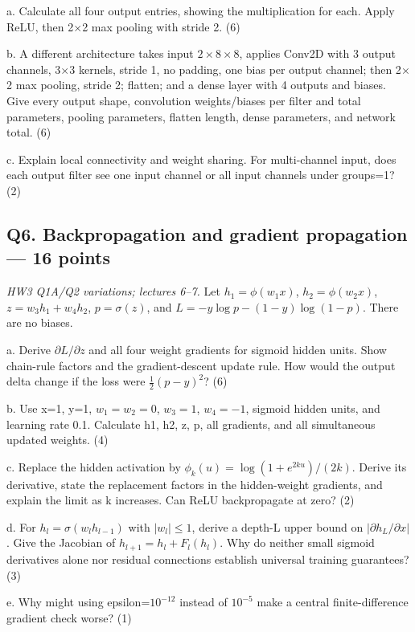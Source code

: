 \documentclass[11pt]{article}
\begin{document}
a. Calculate all four output entries, showing the multiplication for each. Apply ReLU, then 2\ensuremath{\times}2 max pooling with stride 2. (6)

b. A different architecture takes input $2\times 8\times 8$, applies Conv2D with 3 output channels, 3\ensuremath{\times}3 kernels, stride 1, no padding, one bias per output channel; then 2\ensuremath{\times}2 max pooling, stride 2; flatten; and a dense layer with 4 outputs and biases. Give every output shape, convolution weights/\allowbreak{}biases per filter and total parameters, pooling parameters, flatten length, dense parameters, and network total. (6)

c. Explain local connectivity and weight sharing. For multi-channel input, does each output filter see one input channel or all input channels under groups=1? (2)

\subsection*{Q6. Backpropagation and gradient propagation — 16 points}

\emph{HW3 Q1A/\allowbreak{}Q2 variations; lectures 6–7.} Let $h_1=\phi(w_1x)$, $h_2=\phi(w_2x)$, $z=w_3h_1+w_4h_2$, $p=\sigma(z)$, and $L=-y\log p-(1-y)\log(1-p)$. There are no biases.

a. Derive $\partial L/\partial z$ and all four weight gradients for sigmoid hidden units. Show chain-rule factors and the gradient-descent update rule. How would the output delta change if the loss were $\frac12(p-y)^2$? (6)

b. Use x=1, y=1, $w_1=w_2=0$, $w_3=1$, $w_4=-1$, sigmoid hidden units, and learning rate 0.1. Calculate h1, h2, z, p, all gradients, and all simultaneous updated weights. (4)

c. Replace the hidden activation by $\phi_k(u)=\log(1+e^{2ku})/(2k)$. Derive its derivative, state the replacement factors in the hidden-weight gradients, and explain the limit as k increases. Can ReLU backpropagate at zero? (2)

d. For $h_l=\sigma(w_lh_{l-1})$ with $|w_l|\le1$, derive a depth-L upper bound on $|\partial h_L/\partial x|$. Give the Jacobian of $h_{l+1}=h_l+F_l(h_l)$. Why do neither small sigmoid derivatives alone nor residual connections establish universal training guarantees? (3)

e. Why might using epsilon=$10^{-12}$ instead of $10^{-5}$ make a central finite-difference gradient check worse? (1)
\end{document}

